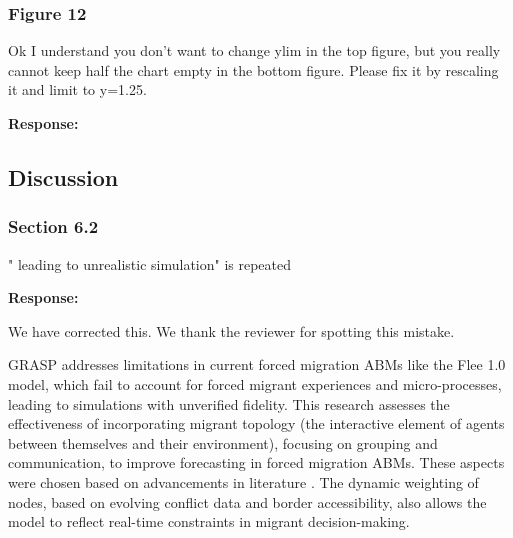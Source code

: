 \documentclass[11pt,a4paper]{article}
\begin{document}
\vspace{0.5cm}

\subsubsection*{Figure 12}

\begin{reviewbox}
Ok I understand you don't want to change ylim in the top figure, but you really cannot keep half the chart empty in the bottom figure. Please fix it by rescaling it and limit to y=1.25.
\end{reviewbox}

\textbf{Response:}

\vspace{0.5cm}

\begin{updatebox}

\end{updatebox}

\vspace{0.5cm}

\subsection*{Discussion}

\subsubsection*{Section 6.2}

\begin{reviewbox}
" leading to unrealistic simulation" is repeated
\end{reviewbox}

\textbf{Response:}

We have corrected this. We thank the reviewer for spotting this mistake.

\vspace{0.5cm}

\begin{updatebox}
GRASP addresses limitations in current forced migration ABMs like the Flee 1.0 model, which fail to account for forced 
migrant experiences and micro-processes, leading to simulations with unverified 
fidelity. This research assesses the effectiveness of incorporating migrant topology (the interactive element of agents 
between themselves and their environment), focusing on grouping and communication, to improve forecasting in forced 
migration ABMs. These aspects were chosen based on advancements in literature 
\citep{84-hinsch2019rumours,163-bijak2021routes,121-collins2016agent-based}. The dynamic weighting of nodes, based on 
evolving conflict data and border accessibility, also allows the model to reflect real-time constraints in migrant 
decision-making.
\end{updatebox}
\end{document}
